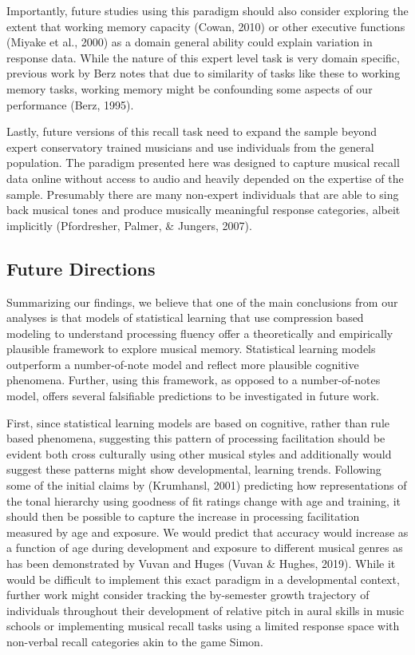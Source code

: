 \documentclass[english,man,floatsintext]{apa6}
\begin{document}
Importantly, future studies using this paradigm should also consider exploring the extent that working memory capacity (Cowan, 2010) or other executive functions (Miyake et al., 2000) as a domain general ability could explain variation in response data.
While the nature of this expert level task is very domain specific, previous work by Berz notes that due to similarity of tasks like these to working memory tasks, working memory might be confounding some aspects of our performance (Berz, 1995).

Lastly, future versions of this recall task need to expand the sample beyond expert conservatory trained musicians and use individuals from the general population.
The paradigm presented here was designed to capture musical recall data online without access to audio and heavily depended on the expertise of the sample.
Presumably there are many non-expert individuals that are able to sing back musical tones and produce musically meaningful response categories, albeit implicitly (Pfordresher, Palmer, \& Jungers, 2007).

\hypertarget{future-directions}{%
\subsection{Future Directions}\label{future-directions}}

Summarizing our findings, we believe that one of the main conclusions from our analyses is that models of statistical learning that use compression based modeling to understand processing fluency offer a theoretically and empirically plausible framework to explore musical memory.
Statistical learning models outperform a number-of-note model and reflect more plausible cognitive phenomena.
Further, using this framework, as opposed to a number-of-notes model, offers several falsifiable predictions to be investigated in future work.

First, since statistical learning models are based on cognitive, rather than rule based phenomena, suggesting this pattern of processing facilitation should be evident both cross culturally using other musical styles and additionally would suggest these patterns might show developmental, learning trends.
Following some of the initial claims by (Krumhansl, 2001) predicting how representations of the tonal hierarchy using goodness of fit ratings change with age and training, it should then be possible to capture the increase in processing facilitation measured by age and exposure.
We would predict that accuracy would increase as a function of age during development and exposure to different musical genres as has been demonstrated by Vuvan and Huges (Vuvan \& Hughes, 2019).
While it would be difficult to implement this exact paradigm in a developmental context, further work might consider tracking the by-semester growth trajectory of individuals throughout their development of relative pitch in aural skills in music schools or implementing musical recall tasks using a limited response space with non-verbal recall categories akin to the game Simon.
\end{document}
